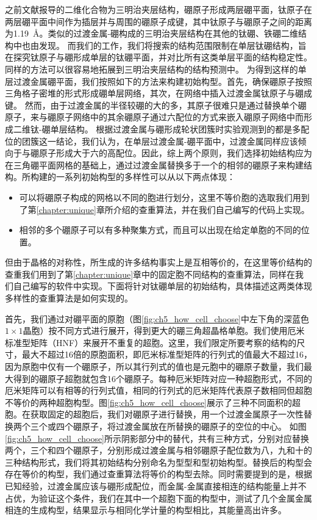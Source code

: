 之前文献报导的二维化合物为三明治夹层结构，硼原子形成两层硼平面，钛原子在两层硼平面中间作为插层并与周围的硼原子成键，其中钛原子与硼原子之间的距离为\SI{1.19}{\angstrom}。类似的过渡金属-硼构成的三明治夹层结构在其他的钛硼、铁硼二维结构中也由发现。
而我们的工作，我们将搜索的结构范围限制在单层钛硼结构，旨在探究钛原子与硼形成单层的钛硼平面，并对比所有这类单层平面的结构稳定性。
同样的方法可以很容易地拓展到三明治夹层结构的结构预测中。
为得到这样的单层过渡金属硼平面，我们按照如下的方法来构建初始构型。首先，确保硼原子按照三角格子密堆的形式形成硼单层网络，其次，在网络中插入过渡金属钛原子与硼成键。
然而，由于过渡金属的半径较硼的大的多，其原子很难只是通过替换单个硼原子，来与硼原子网络中的其余硼原子通过六配位的方式来嵌入硼原子网络中而形成二维钛-硼单层结构。
根据过渡金属与硼形成轮状团簇时实验观测到的都是多配位的团簇这一结论，我们认为，在单层过渡金属-硼平面中，过渡金属同样应该倾向于与硼原子形成大于六的高配位。因此，综上两个原则，我们选择初始结构应为在三角硼平面网格的基础上，通过过渡金属替换多于一个的相邻的硼原子来构建结构。所构建的一系列初始构型的多样性可以从以下两点体现：
\begin{itemize}
  \item 可以将硼原子构成的网格以不同的胞进行划分，这里不等价胞的选取我们用到了第\ref{chapter:unique}章所介绍的查重算法，并在我们自己编写的代码上实现。
  \item 相邻的多个硼原子可以有多种聚集方式，而且可以出现在给定单胞的不同的位置。
\end{itemize}
但由于晶格的对称性，所生成的许多结构事实上是互相等价的，在这里等价结构的查重我们用到了第\ref{chapter:unique}章中的固定胞不同结构的查重算法，同样在我们自己编写的软件中实现。下面将针对钛硼单层的初始结构，具体描述这两类体现多样性的查重算法是如何实现的。

首先，我们通过对硼平面的原胞（图\ref{fig:ch5_how_cell_choose}中左下角的深蓝色$1\times 1$晶胞）按不同方式进行展开，得到更大的硼三角超晶格单胞。我们使用厄米标准型矩阵（HNF）\cite{hart2008algorithm}来展开不重复的超胞。这里，我们限定所要考察的结构的尺寸，最大不超过\num{16}倍的原胞面积，即厄米标准型矩阵的行列式的值最大不超过\num{16}，因为原胞中仅有一个硼原子，所以其行列式的值也是元胞中的硼原子数量，我们最大得到的硼原子超胞就包含\num{16}个硼原子。每种厄米矩阵对应一种超胞形式，不同的厄米矩阵可以有相等的行列式值，相同的行列式的厄米矩阵代表原子数相同但超胞不等价的两种超胞构型。图\ref{fig:ch5_how_cell_choose}展示了三种不同面积的超胞。在获取固定的超胞后，我们对硼原子进行替换，用一个过渡金属原子一次性替换两个三个或四个硼原子，将过渡金属放在所替换的硼原子的空位的中心。
如图\ref{fig:ch5_how_cell_choose}所示阴影部分中的替代，共有三种方式，分别对应替换两个，三个和四个硼原子，分别形成过渡金属与相邻硼原子配位数为八，九和十的三种结构形式，我们将其初始结构分别命名为型型和型初始构型。替换后的构型会存在等价的构型，我们通过查重算法将等价的构型去除。同时需要提到的是，根据已知经验，过渡金属应该与硼形成配位，而金属-金属直接相连的结构能量上并不占优，为验证这个条件，我们在其中一个超胞下面的构型中，测试了几个金属金属相连的生成构型，结果显示与相同化学计量的构型相比，其能量高出许多。

